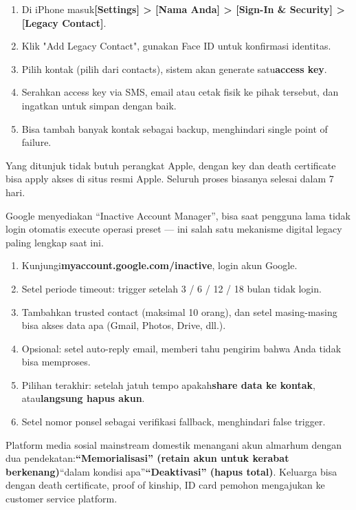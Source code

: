 \begin{enumerate}
  \item Di iPhone masuk\textbf{[Settings] > [Nama Anda] > [Sign-In \& Security] > [Legacy Contact]}.
  \item Klik "Add Legacy Contact", gunakan Face ID untuk konfirmasi identitas.
  \item Pilih kontak (pilih dari contacts), sistem akan generate satu\textbf{access key}.
  \item Serahkan access key via SMS, email atau cetak fisik ke pihak tersebut, dan ingatkan untuk simpan dengan baik.
  \item Bisa tambah banyak kontak sebagai backup, menghindari single point of failure.
\end{enumerate}

Yang ditunjuk tidak butuh perangkat Apple, dengan key dan death certificate bisa apply akses di situs resmi Apple. Seluruh proses biasanya selesai dalam 7 hari.


Google menyediakan “Inactive Account Manager”, bisa saat pengguna lama tidak login otomatis execute operasi preset — ini salah satu mekanisme digital legacy paling lengkap saat ini.

\begin{enumerate}
  \item Kunjungi\textbf{myaccount.google.com/inactive}, login akun Google.
  \item Setel periode timeout: trigger setelah 3 / 6 / 12 / 18 bulan tidak login.
  \item Tambahkan trusted contact (maksimal 10 orang), dan setel masing-masing bisa akses data apa (Gmail, Photos, Drive, dll.).
  \item Opsional: setel auto-reply email, memberi tahu pengirim bahwa Anda tidak bisa memproses.
  \item Pilihan terakhir: setelah jatuh tempo apakah\textbf{share data ke kontak}, atau\textbf{langsung hapus akun}.
  \item Setel nomor ponsel sebagai verifikasi fallback, menghindari false trigger.
\end{enumerate}


Platform media sosial mainstream domestik menangani akun almarhum dengan dua pendekatan:\textbf{“Memorialisasi” (retain akun untuk kerabat berkenang)}“dalam kondisi apa”\textbf{“Deaktivasi” (hapus total)}. Keluarga bisa dengan death certificate, proof of kinship, ID card pemohon mengajukan ke customer service platform.

